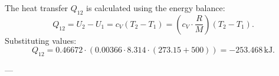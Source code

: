 The heat transfer \( Q_{12} \) is calculated using the energy balance:  
\[
Q_{12} = U_2 - U_1 = c_V (T_2 - T_1) = \left(c_V \cdot \frac{R}{M}\right) (T_2 - T_1).
\]  
Substituting values:  
\[
Q_{12} = 0.46672 \cdot (0.00366 \cdot 8.314 \cdot (273.15 + 500)) = -253.468 \, \text{kJ}.
\]  

---
